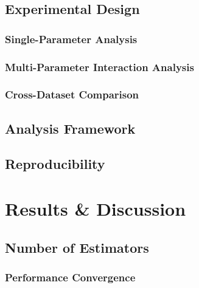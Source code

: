 \documentclass[10pt, conference]{IEEEtran}
\begin{document}
\subsection{Experimental Design}
\subsubsection{Single-Parameter Analysis}
\subsubsection{Multi-Parameter Interaction Analysis}
\subsubsection{Cross-Dataset Comparison}

\subsection{Analysis Framework}





\subsection{Reproducibility}



\section{Results \& Discussion}
\subsection{Number of Estimators}
\subsubsection{Performance Convergence}
\end{document}
